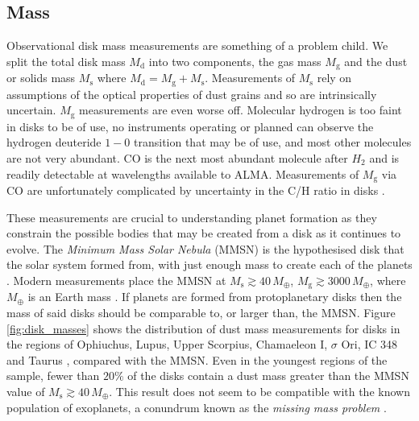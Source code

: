\subsection{Mass}

Observational disk mass measurements are something of a problem child.
We split the total disk mass $M_\mathrm{d}$ into two components, the gas mass $M_\mathrm{g}$  and the dust or solids mass $M_\mathrm{s}$ where $M_\mathrm{d} = M_\mathrm{g} + M_\mathrm{s}$.
Measurements of $M_\mathrm{s}$ rely on assumptions of the optical properties of dust grains and so are intrinsically uncertain.
$M_\mathrm{g}$ measurements are even worse off.
Molecular hydrogen is too faint in disks to be of use, no instruments operating or planned can observe the hydrogen deuteride $1-0$ transition that may be of use, and most other molecules are not very abundant.
CO is the next most abundant molecule after $H_2$ and is readily detectable at wavelengths available to ALMA.
Measurements of $M_\mathrm{g}$ via CO are unfortunately complicated by uncertainty in the C/H ratio in disks \citep[see the review by][for in-depth discussion of difficulties with disk mass measurements]{miotello2022}.

These measurements are crucial to understanding planet formation as they constrain the possible bodies that may be created from a disk as it continues to evolve.
The \textit{Minimum Mass Solar Nebula} (MMSN) is the hypothesised disk that the solar system formed from, with just enough mass to create each of the planets \citep{weidenschilling1977b,hayashi1981}.
Modern measurements place the MMSN at $M_\mathrm{s} \gtrsim 40 \, M_\oplus$, $M_\mathrm{g} \gtrsim 3000 \, M_\oplus$, where $M_\oplus$ is an Earth mass \citep[see review by][]{andrews2020}.
If planets are formed from protoplanetary disks then the mass of said disks should be comparable to, or larger than, the MMSN.
Figure \ref{fig:disk_masses} shows the distribution of dust mass measurements for disks in the regions of Ophiuchus, Lupus, Upper Scorpius, Chamaeleon I, $\sigma$ Ori, IC 348 and Taurus \citep[and references therin]{cieza2019}, compared with the MMSN.
Even in the youngest regions of the sample, fewer than $20\%$ of the disks contain a dust mass greater than the MMSN value of $M_\mathrm{s}\gtrsim 40 \, M_\oplus$.
This result does not seem to be compatible with the known population of exoplanets, a conundrum known as the \textit{missing mass problem} \citep[e.g.]{najita2014}.

